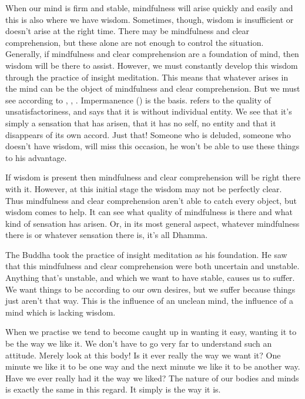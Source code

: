 When our mind is firm and stable, mindfulness will arise quickly and easily and this is also where we have wisdom. Sometimes, though, wisdom is insufficient or doesn't arise at the right time. There may be mindfulness and clear comprehension, but these alone are not enough to control the situation. Generally, if mindfulness and clear comprehension are a foundation of mind, then wisdom will be there to assist. However, we must constantly develop this wisdom through the practice of insight meditation. This means that whatever arises in the mind can be the object of mindfulness and clear comprehension. But we must see according to , , . Impermanence () is the basis.  refers to the quality of unsatisfactoriness, and  says that it is without individual entity. We see that it's simply a sensation that has arisen, that it has no self, no entity and that it disappears of its own accord. Just that! Someone who is deluded, someone who doesn't have wisdom, will miss this occasion, he won't be able to use these things to his advantage.

If wisdom is present then mindfulness and clear comprehension will be right there with it. However, at this initial stage the wisdom may not be perfectly clear. Thus mindfulness and clear comprehension aren't able to catch every object, but wisdom comes to help. It can see what quality of mindfulness is there and what kind of sensation has arisen. Or, in its most general aspect, whatever mindfulness there is or whatever sensation there is, it's all Dhamma.

The Buddha took the practice of insight meditation as his foundation. He saw that this mindfulness and clear comprehension were both uncertain and unstable. Anything that's unstable, and which we want to have stable, causes us to suffer. We want things to be according to our own desires, but we suffer because things just aren't that way. This is the influence of an unclean mind, the influence of a mind which is lacking wisdom.

When we practise we tend to become caught up in wanting it easy, wanting it to be the way we like it. We don't have to go very far to understand such an attitude. Merely look at this body! Is it ever really the way we want it? One minute we like it to be one way and the next minute we like it to be another way. Have we ever really had it the way we liked? The nature of our bodies and minds is exactly the same in this regard. It simply is the way it is.

